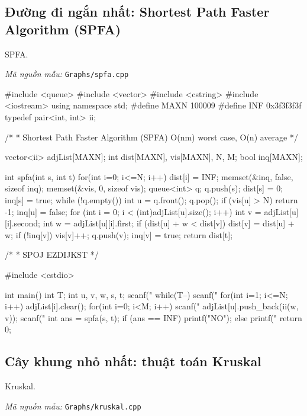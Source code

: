 \documentclass[11pt]{article}
\newcommand{\codepath}[1]{\par\noindent\textit{Mã nguồn mẫu:} \texttt{#1}\par}
\begin{document}
\subsection{Đường đi ngắn nhất: Shortest Path Faster Algorithm (SPFA)}

SPFA.

\codepath{Graphs/spfa.cpp}

\begingroup\scriptsize
\begin{vncode}
#include <queue>
#include <vector>
#include <cstring>
#include <iostream>
using namespace std;
#define MAXN 100009
#define INF 0x3f3f3f3f
typedef pair<int, int> ii;

/*
 * Shortest Path Faster Algorithm (SPFA) O(nm) worst case, O(n) average
 */

vector<ii> adjList[MAXN];
int dist[MAXN], vis[MAXN], N, M;
bool inq[MAXN];
 
int spfa(int s, int t) {
	for(int i=0; i<=N; i++) dist[i] = INF;
	memset(&inq, false, sizeof inq);
	memset(&vis, 0, sizeof vis);
	queue<int> q;
	q.push(s);
	dist[s] = 0;
	inq[s] = true;
	while (!q.empty()) {
		int u = q.front(); q.pop();
		if (vis[u] > N) return -1;
		inq[u] = false;
		for (int i = 0; i < (int)adjList[u].size(); i++) {
			int v = adjList[u][i].second;
			int w = adjList[u][i].first;
			if (dist[u] + w < dist[v]) {
				dist[v] = dist[u] + w;
				if (!inq[v]) {
					vis[v]++; q.push(v);
					inq[v] = true;
				}
			}
		}
	}
	return dist[t];
}

/*
 * SPOJ EZDIJKST
 */

#include <cstdio>

int main() {
	int T;
	int u, v, w, s, t;
	scanf("%
	while(T--) {
		scanf("%
		for(int i=1; i<=N; i++) adjList[i].clear();
		for(int i=0; i<M; i++) {
			scanf("%
			adjList[u].push_back(ii(w, v));
		}
		scanf("%
		int ans = spfa(s, t);
		if (ans == INF) printf("NO\n");
		else printf("%
	}
	return 0;
}
\end{vncode}
\endgroup


\subsection{Cây khung nhỏ nhất: thuật toán Kruskal}

Kruskal.

\codepath{Graphs/kruskal.cpp}
\end{document}
